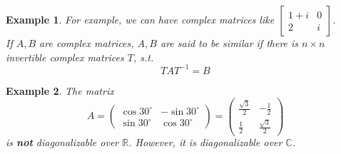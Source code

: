 \documentclass{article}
\theoremstyle{MyNonumberplain}
\theoremstyle{break}
\theoremstyle{break}
\newtheorem{example}{Example}[section]
\theoremstyle{break}
\theoremstyle{definition}
\theoremstyle{break}
\begin{document}
\begin{expbox}
    \begin{example}
        For example, we can have complex matrices like $\left[\begin{array}{cc}
            1 + i & 0\\
            2 & i
          \end{array}\right]$.\\
          
          If $A, B$ are complex matrices, $A, B$ are said to be similar if there is $ n
          \times n$ invertible complex matrices $T$, s.t.
          \[ T A T^{- 1} = B \]  
    \end{example}
\end{expbox}

\begin{expbox}
    \begin{example}
        The matrix
        \[ A = \left(\begin{array}{cc}
             \cos 30^{\circ} & - \sin 30^{\circ}\\
             \sin 30^{\circ} & \cos 30^{\circ}
           \end{array}\right) = \left(\begin{array}{cc}
             \frac{\sqrt{3}}{2} & - \frac{1}{2}\\
             \frac{1}{2} & \frac{\sqrt{3}}{2}
           \end{array}\right) \]
        is \textbf{not} diagonalizable over $\mathbb{R}$. However, it is
        diagonalizable over $\mathbb{C}$.
    \end{example}
\end{expbox}
\end{document}
